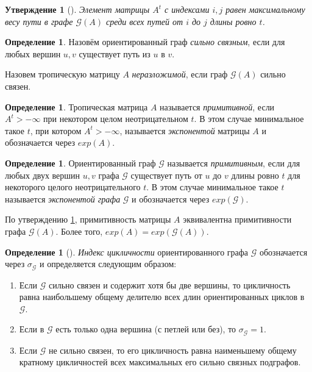 \documentclass[12pt]{article}
\newtheorem{proposition}[theorem]{Утверждение}
\theoremstyle{definition}
\newtheorem{definition}[theorem]{Определение}
\begin{document}
\begin{proposition} [{\cite[равенство (9)]{bounds}}]
\label{entriesInPower}
Элемент матрицы $A^t$ с индексами $i, j$ равен максимальному весу пути в графе $\mathcal{G}(A)$ среди всех путей от $i$ до $j$ длины ровно $t$.
\end{proposition}

\begin{definition}
Назовём ориентированный граф \textit{сильно связным}, если для любых вершин $u, v$ существует путь из $u$ в $v$.

Назовем тропическую матрицу $A$ \textit{неразложимой}, если граф $\mathcal{G}(A)$ сильно связен.
\end{definition}

\begin{definition}
Тропическая матрица $A$ называется \textit{примитивной}, если $A^t > -\infty$ при некотором целом неотрицательном $t$. В этом случае минимальное такое $t$, при котором $A^t > -\infty$, называется \textit{экспонентой} матрицы $A$ и обозначается через $exp(A)$.
\end{definition}

\begin{definition}
Ориентированный граф $\mathcal{G}$ называется \textit{примитивным}, если для любых двух вершин $u, v$ графа $\mathcal{G}$ существует путь от $u$ до $v$ длины ровно $t$ для некоторого целого неотрицательного $t$.  В этом случае минимальное такое $t$ называется \textit{экспонентой графа} $\mathcal{G}$ и обозначается через $exp(\mathcal{G})$.
\end{definition}

По утверждению \ref{entriesInPower}, примитивность матрицы $A$ эквивалентна примитивности графа $\mathcal{G}(A)$. Более того, $exp(A) = exp(\mathcal{G}(A))$.

\begin{definition} [{\cite[опр. 2.1]{cyclicity}}]
\textit{Индекс цикличности} ориентированного графа $\mathcal{G}$ обозначается через $\sigma_\mathcal{G}$ и определяется следующим образом:
\begin{enumerate}
    \item Если $\mathcal{G}$ сильно связен и содержит хотя бы две вершины, то цикличность равна наибольшему общему делителю всех длин ориентированных циклов в $\mathcal{G}$.
    \item Если в $\mathcal{G}$ есть только одна вершина (с петлей или без), то $\sigma_\mathcal{G} = 1$.
    \item Если $\mathcal{G}$ не сильно связен, то его цикличность равна наименьшему общему кратному цикличностей всех максимальных его сильно связных подграфов.
\end{enumerate}
\end{definition}
\end{document}
